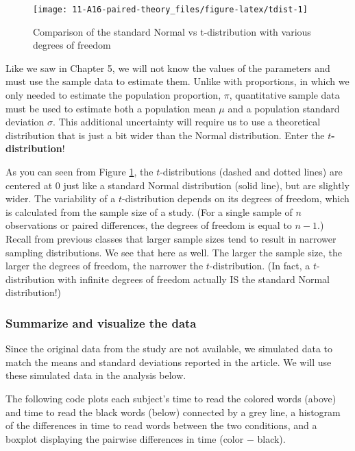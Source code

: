 \documentclass[
]{report}
\begin{document}
\begin{figure}

{\centering \texttt{[image: 11-A16-paired-theory\_files/figure-latex/tdist-1]} 

}

\caption{Comparison of the standard Normal vs t-distribution with various degrees of freedom}\label{fig:tdist}
\end{figure}

Like we saw in Chapter 5, we will not know the values of the parameters and must use the sample data to estimate them. Unlike with proportions, in which we only needed to estimate the population proportion, \(\pi\), quantitative sample data must be used to estimate both a population mean \(\mu\) and a population standard deviation \(\sigma\). This additional uncertainty will require us to use a theoretical distribution that is just a bit wider than the Normal distribution. Enter the \textbf{\(t\)-distribution}!

As you can seen from Figure \ref{fig:tdist}, the \(t\)-distributions (dashed and dotted lines) are centered at 0 just like a standard Normal distribution (solid line), but are slightly wider. The variability of a \(t\)-distribution depends on its degrees of freedom, which is calculated from the sample size of a study. (For a single sample of \(n\) observations or paired differences, the degrees of freedom is equal to \(n-1\).) Recall from previous classes that larger sample sizes tend to result in narrower sampling distributions. We see that here as well. The larger the sample size, the larger the degrees of freedom, the narrower the \(t\)-distribution. (In fact, a \(t\)-distribution with infinite degrees of freedom actually IS the standard Normal distribution!)

\hypertarget{summarize-and-visualize-the-data-3}{%
\subsubsection*{Summarize and visualize the data}\label{summarize-and-visualize-the-data-3}}

Since the original data from the study are not available, we simulated data to match the means and standard deviations reported in the article. We will use these simulated data in the analysis below.

The following code plots each subject's time to read the colored words (above) and time to read the black words (below) connected by a grey line, a histogram of the differences in time to read words between the two conditions, and a boxplot displaying the pairwise differences in time (color \(-\) black).
\end{document}
